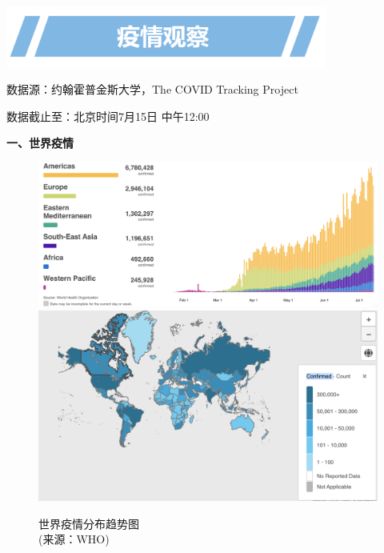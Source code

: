 \documentclass[]{article}
\begin{document}
\newpage
\vspace{10mm}

\begin{center}
\includegraphics[height=2cm]{./input/title2.png} 
\end{center}

\begin{Large}
\vspace{-7mm}
{数据源：约翰霍普金斯大学，The COVID Tracking  Project}
\end{Large}

\vspace{-7mm}

\begin{Large}
{数据截止至：北京时间7月15日 中午12:00}
\end{Large}

\begin{huge}{\textcolor{glaucous}{\textbf {一、世界疫情}}}\end{huge}

\begin{figure}[H]
\caption{世界疫情分布趋势图\\ \vspace{-3mm}(来源：WHO)} %
\centering
\includegraphics[]{./input/covid1.png} %
\includegraphics[]{./input/covid4.png}
\label{} %
\end{figure}
\end{document}
